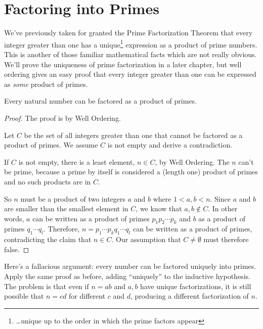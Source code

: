 \begin{problems}
\classproblems
{}
\end{problems}

\section{Factoring into Primes}

We've previously taken for granted the Prime Factorization Theorem that
every integer greater than one has a unique\footnote{\dots unique up to the
  order in which the prime factors appear} expression as a product of
prime numbers.  This is another of those familiar mathematical facts which
are not really obvious.  We'll prove the uniqueness of prime factorization
in a later chapter, but well ordering gives an easy proof that every
integer greater than one can be expressed as \emph{some} product of
primes.

\begin{theorem}
Every natural number can be factored as a product of primes.
\end{theorem}
\begin{proof}
The proof is by Well Ordering.

Let $C$ be the set of all integers greater than one that cannot be
factored as a product of primes.  We assume $C$ is not empty and derive a
contradiction.

If $C$ is not empty, there is a least element, $n \in C$, by Well
Ordering.  The $n$ can't be prime, because a prime by itself is considered
a (length one) product of primes and no such products are in $C$.

So $n$ must be a product of two integers $a$ and $b$ where $1<a,b<n$.
Since $a$ and $b$ are smaller than the smallest element in $C$, we know
that $a,b \notin C$.  In other words, $a$ can be written as a product of
primes $p_1p_2\cdots p_k$ and $b$ as a product of primes $q_1\cdots q_l$.
Therefore, $n=p_1\cdots p_k q_1 \cdots q_l$ can be written as a product of
primes, contradicting the claim that $n \in C$.  Our assumption that $C
\neq \emptyset$ must therefore false.
\end{proof}

\iffalse

Here's a fallacious argument: every number can be factored uniquely
into primes.  Apply the same proof as before, adding ``uniquely'' to
the inductive hypothesis.  The problem is that even if $n=ab$ and
$a,b$ have unique factorizations, it is still possible that $n=cd$ for
different $c$ and $d$, producing a different factorization of $n$.

